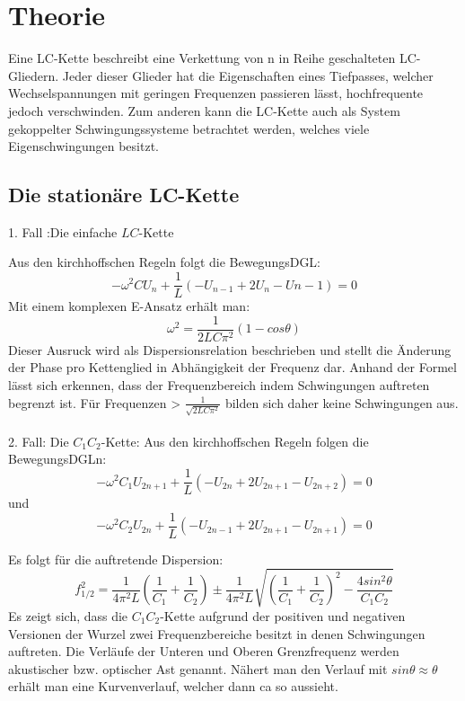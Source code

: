 
\section{Theorie}
\label{sec:Theorie}

Eine LC-Kette beschreibt eine Verkettung von n in Reihe geschalteten LC-Gliedern.
 Jeder dieser Glieder hat die Eigenschaften eines Tiefpasses, welcher
  Wechselspannungen mit geringen Frequenzen passieren lässt, hochfrequente jedoch
   verschwinden. Zum anderen kann die LC-Kette auch als System gekoppelter
    Schwingungssysteme betrachtet werden, welches viele Eigenschwingungen besitzt.


\subsection{Die stationäre LC-Kette}
1. Fall :Die einfache $LC$-Kette

Aus den kirchhoffschen Regeln folgt die BewegungsDGL:
\begin{equation}
- \omega ^2 C U_n + \frac{1}{L} \left( -U_{n-1} + 2U_ n -U{n-1} \right) = 0
\end{equation}
Mit einem komplexen E-Ansatz erhält man:
\begin{equation}
\omega ^2 = \frac{1}{2LC\pi^2}(1-cos\theta)
\end{equation}
Dieser Ausruck wird als Dispersionsrelation beschrieben und stellt die Änderung
 der Phase pro Kettenglied in Abhängigkeit der Frequenz dar. Anhand der Formel lässt sich erkennen,
  dass der Frequenzbereich indem Schwingungen auftreten begrenzt ist. Für Frequenzen >
 $\frac{1}{\sqrt{2LC\pi^2}}$ bilden sich daher keine Schwingungen aus.\\\\

 2. Fall: Die $C_1C_2$-Kette:
 Aus den kirchhoffschen Regeln folgen die BewegungsDGLn:
 \begin{equation}
   -\omega^2 C_1 U_{2n+1} + \frac{1}{L} \left( -U_{2n} + 2U_{2n+1} - U_{2n+2} \right) = 0
 \end{equation}
 und
 \begin{equation}
   -\omega^2 C_2 U_{2n} + \frac{1}{L} \left( -U_{2n-1} + 2U_{2n+1} - U_{2n+1} \right) = 0
 \end{equation}

Es folgt für die auftretende Dispersion:
\begin{equation}
  f_{1/2}^2 = \frac{1}{4\pi^2L}\left(\frac{1}{C_1}+\frac{1}{C_2}\right) \pm \frac{1}{4\pi^2L}\sqrt{\left(\frac{1}{C_1}+\frac{1}{C_2} \right)^2 - \frac{4 sin^2\theta}{C_1C_2}}
\end{equation}
Es zeigt sich, dass die $C_1C_2$-Kette aufgrund der positiven und negativen Versionen der Wurzel
zwei Frequenzbereiche besitzt in denen Schwingungen auftreten. Die Verläufe der Unteren und Oberen
 Grenzfrequenz werden akustischer bzw. optischer Ast genannt. Nähert man den Verlauf mit $sin \theta \approx \theta$ erhält man eine Kurvenverlauf, welcher dann ca so aussieht.
